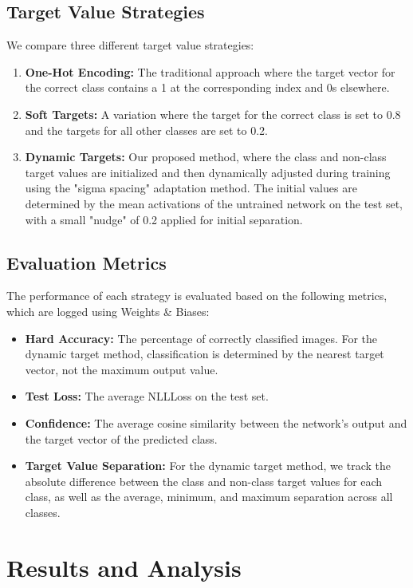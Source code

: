 \documentclass[12pt,fleqn,a4paper]{article}
\begin{document}
 \subsection{Target Value Strategies}
 We compare three different target value strategies:
 \begin{enumerate}
     \item \textbf{One-Hot Encoding:} The traditional approach where the target vector for the correct class contains a 1 at the corresponding index and 0s elsewhere.
     \item \textbf{Soft Targets:} A variation where the target for the correct class is set to 0.8 and the targets for all other classes are set to 0.2.
     \item \textbf{Dynamic Targets:} Our proposed method, where the class and non-class target values are initialized and then dynamically adjusted during training using the "sigma spacing" adaptation method. The initial values are determined by the mean activations of the untrained network on the test set, with a small "nudge" of 0.2 applied for initial separation.
 \end{enumerate}

 \subsection{Evaluation Metrics}
 The performance of each strategy is evaluated based on the following metrics, which are logged using Weights \& Biases:
 \begin{itemize}
     \item \textbf{Hard Accuracy:} The percentage of correctly classified images. For the dynamic target method, classification is determined by the nearest target vector, not the maximum output value.
     \item \textbf{Test Loss:} The average NLLLoss on the test set.
     \item \textbf{Confidence:} The average cosine similarity between the network's output and the target vector of the predicted class.
     \item \textbf{Target Value Separation:} For the dynamic target method, we track the absolute difference between the class and non-class target values for each class, as well as the average, minimum, and maximum separation across all classes.
 \end{itemize}

\section{Results and Analysis}
\end{document}
